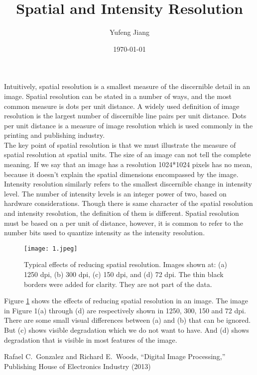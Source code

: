 \documentclass[11pt,twocolumn]{article}
\title{Spatial and Intensity Resolution}
\author{Yufeng Jiang}
\date{\today}
\begin{document}
\onecolumn
\maketitle
\begin{multicols}{2}
Intuitively, spatial resolution is a smallest measure of the discernible detail in an image. Spatial resolution can be stated in a number of ways, and the most common measure is dots per unit distance. A widely used definition of image resolution is the largest number of discernible line pairs per unit distance. Dots per unit distance is a measure of image resolution which is used commonly in the printing and publishing industry.\\
\indent  The key point of spatial resolution is that we must illustrate the measure of spatial resolution at spatial units. The size of an image can not tell the complete meaning. If we say that an image has a resolution 1024*1024 pixels has no mean, because it doesn’t explain the spatial dimensions encompassed by the image. \\
\indent Intensity resolution similarly refers to the smallest discernible change in intensity level. The number of intensity levels is an integer power of two, based on hardware considerations. Though there is same character of the spatial resolution and intensity resolution, the definition of them is different. Spatial resolution must be based on a per unit of distance, however, it is common to refer to the number bits used to quantize intensity as the intensity resolution.\\
\begin{figure}[H]
\centering
\texttt{[image: 1.jpeg]}
\caption{Typical effects of reducing spatial resolution. Images shown at: (a) 1250 dpi, (b) 300 dpi, (c) 150 dpi, and (d) 72 dpi. The thin black borders were added for clarity. They are not part of the data.}
\label{Figure 1}
\end{figure}
\indent Figure \ref{Figure 1} shows the effects of reducing spatial resolution in an image. The image in Figure 1(a) through (d) are respectively shown in 1250, 300, 150 and 72 dpi. There are some small visual differences between (a) and (b) that can be ignored. But (c) shows visible degradation which we do not want to have. And (d) shows degradation that is visible in most features of the image.
\end{multicols}
\begin{thebibliography}{9}
 Rafael C.~Gonzalez and Richard E.~Woods, ``Digital Image Processing,'' Publishing House of Electronics Industry (2013)
\end{thebibliography}
\end{document}
